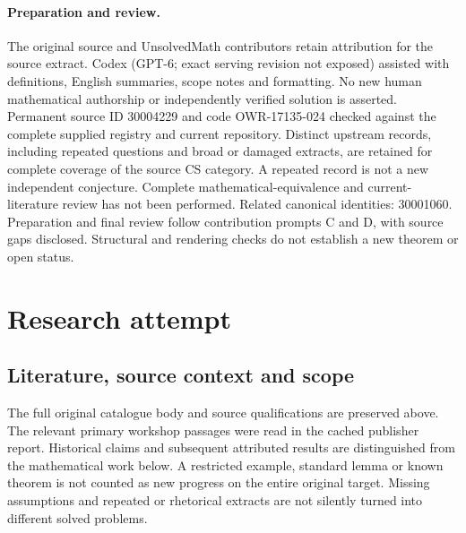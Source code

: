 \documentclass[11pt]{article}
\begin{document}
\paragraph{Preparation and review.}
The original source and UnsolvedMath contributors retain attribution for the source extract. Codex (GPT-6; exact serving revision not exposed) assisted with definitions, English summaries, scope notes and formatting. No new human mathematical authorship or independently verified solution is asserted. Permanent source ID 30004229 and code OWR-17135-024 checked against the complete supplied registry and current repository. Distinct upstream records, including repeated questions and broad or damaged extracts, are retained for complete coverage of the source CS category. A repeated record is not a new independent conjecture. Complete mathematical-equivalence and current-literature review has not been performed. Related canonical identities: 30001060. Preparation and final review follow contribution prompts C and D, with source gaps disclosed. Structural and rendering checks do not establish a new theorem or open status.
\label{end:30004229}

\section{Research attempt}
\subsection{Literature, source context and scope}
The full original catalogue body and source qualifications are preserved above. The relevant primary workshop passages were read in the cached publisher report. Historical claims and subsequent attributed results are distinguished from the mathematical work below. A restricted example, standard lemma or known theorem is not counted as new progress on the entire original target. Missing assumptions and repeated or rhetorical extracts are not silently turned into different solved problems.
\end{document}
